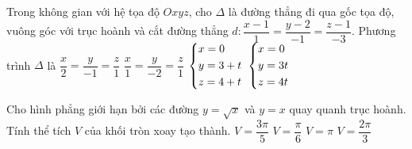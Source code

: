 \begin{ex}%
	Trong không gian với hệ tọa độ $Oxyz$, cho $\Delta $ là đường thẳng đi qua gốc tọa độ, vuông góc với trục hoành và cắt đường thẳng $d\colon \dfrac{x - 1}{1}=\dfrac{y - 2}{- 1}=\dfrac{z - 1}{- 3}$. Phương trình $\Delta $ là 
	\choice
	{$\dfrac{x}{2}=\dfrac{y}{- 1}=\dfrac{z}{1}$}
	{$\dfrac{x}{1}=\dfrac{y}{- 2}=\dfrac{z}{1}$}
	{$\left\{\begin{aligned} & x=0 \\ & y=3 + t \\ 	& z=4 + t \end{aligned}\right. $}
	{\True $\left\{\begin{aligned} & x=0 \\ & y=3t \\ & z=4t \end{aligned}\right. $}
\end{ex}

\begin{ex}%
	Cho hình phẳng giới hạn bởi các đường $y=\sqrt{x}$ và $y=x$ quay quanh trục hoành. Tính thể tích $V$ của khối tròn xoay tạo thành. 
	\choice
	{$V=\dfrac{3\pi}{5}$}
	{\True $V=\dfrac{\pi}{6}$}
	{$V=\pi $}
	{$V=\dfrac{2\pi}{3}$}
\end{ex}


